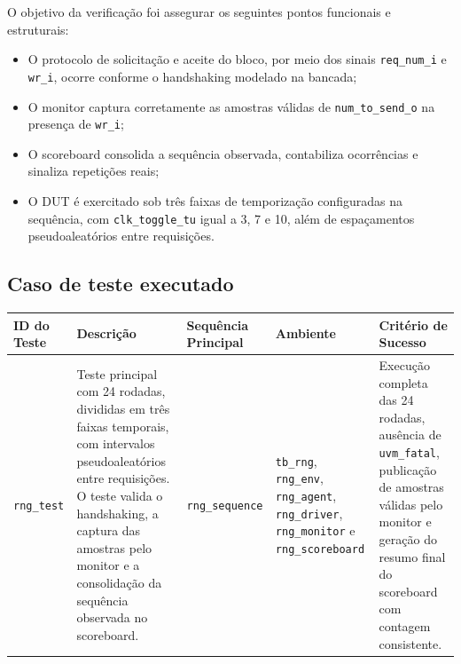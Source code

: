 \documentclass[12pt,a4paper]{article}
\begin{document}
	O objetivo da verificação foi assegurar os seguintes pontos funcionais e estruturais:
	
	\vspace{0.5cm}
	
	\begin{itemize}[leftmargin=1.4em]
		\item O protocolo de solicitação e aceite do bloco, por meio dos sinais \texttt{req\_num\_i} e \texttt{wr\_i}, ocorre conforme o handshaking modelado na bancada;
		\item O monitor captura corretamente as amostras válidas de \texttt{num\_to\_send\_o} na presença de \texttt{wr\_i};
		\item O scoreboard consolida a sequência observada, contabiliza ocorrências e sinaliza repetições reais;
		\item O DUT é exercitado sob três faixas de temporização configuradas na sequência, com \texttt{clk\_toggle\_tu} igual a 3, 7 e 10, além de espaçamentos pseudoaleatórios entre requisições.
	\end{itemize}
	
	\subsection*{Caso de teste executado}
	
	\renewcommand{\arraystretch}{1.35}
	\setlength{\tabcolsep}{5pt}
	
	\begin{table}[H]
		\centering
		\small
		\begin{tabularx}{\textwidth}{|M{1.8cm}|Y|M{2.7cm}|Y|Y|}
			\hline
			\textbf{ID do Teste} & \textbf{Descrição} & \textbf{Sequência Principal} & \textbf{Ambiente} & \textbf{Critério de Sucesso} \\
			\hline
			\texttt{rng\_test} & Teste principal com 24 rodadas, divididas em três faixas temporais, com intervalos pseudoaleatórios entre requisições. O teste valida o handshaking, a captura das amostras pelo monitor e a consolidação da sequência observada no scoreboard. & \texttt{rng\_sequence} & \texttt{tb\_rng}, \texttt{rng\_env}, \texttt{rng\_agent}, \texttt{rng\_driver}, \texttt{rng\_monitor} e \texttt{rng\_scoreboard} & Execução completa das 24 rodadas, ausência de \texttt{uvm\_fatal}, publicação de amostras válidas pelo monitor e geração do resumo final do scoreboard com contagem consistente. \\
			\hline
		\end{tabularx}
	\end{table}
	
\end{document}

